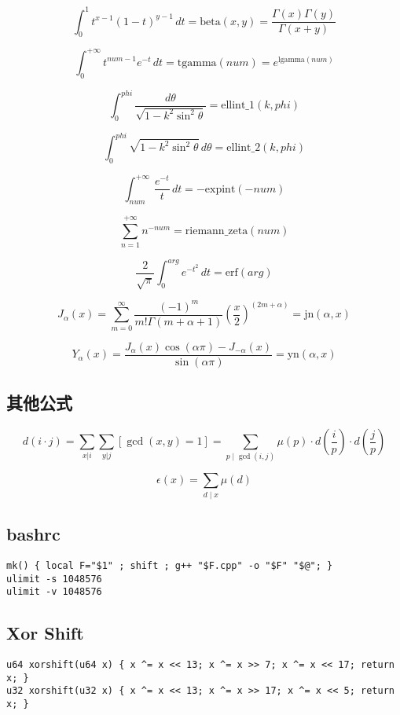 \documentclass[a4paper,landscape,twocolumn]{ctexart}
\begin{document}
{
\Large
$$ \int_0^1 t^{x-1}(1-t)^{y-1}\,dt = \mathrm{beta}(x,y) = \frac{\Gamma(x)\Gamma(y)}{\Gamma(x+y)} $$

$$ \int_0^{+\infty} t^{num-1}e^{-t}\,dt = \mathrm{tgamma}(num) = e^{\mathrm{lgamma}(num)}$$

$$ \int_0^{phi} \frac{d\theta}{\sqrt{1-k^2\sin^2\theta}} = \mathrm{ellint\_1}(k,phi) $$

$$ \int_0^{phi} \sqrt{1-k^2\sin^2\theta}\,d\theta = \mathrm{ellint\_2}(k,phi) $$

$$ \int_{num}^{+\infty} \frac{e^{-t}}{t}\,dt = -\mathrm{expint}(-num) $$

$$ \sum_{n=1}^{+\infty} n^{-num} = \mathrm{riemann\_zeta}(num) $$

$$ \frac{2}{\sqrt{\pi}}\int_0^{arg} e^{-t^2}\,dt = \mathrm{erf}(arg) $$

$$ J_{\alpha} (x) = \sum_{m = 0}^{\infty} \frac{(-1)^m}{m ! \Gamma (m + \alpha + 1)} \left(\frac{x}{2}\right) ^ {(2 m + \alpha)} = \mathrm{jn} (\alpha, x) $$

$$ Y_{\alpha} (x) = \frac{J_{\alpha} (x) \cos (\alpha \pi) - J_{ - \alpha} (x)}{\sin (\alpha \pi)} = \mathrm{yn} (\alpha, x) $$

}

\subsection{其他公式}

{
\Large
$$ d(i \cdot j) = \sum_{x | i} \sum_{y | j} [\gcd (x, y) = 1] = \sum_{p \mid \gcd (i, j)} \mu (p) \cdot d (\frac{i}{p}) \cdot d (\frac{j}{p}) $$

$$ \epsilon (x) = \sum \limits_{d \mid x} \mu (d) $$
}

\subsection{bashrc}

\begin{lstlisting}
mk() { local F="$1" ; shift ; g++ "$F.cpp" -o "$F" "$@"; }
ulimit -s 1048576
ulimit -v 1048576
\end{lstlisting}

\subsection{Xor \space Shift}

\begin{lstlisting}
u64 xorshift(u64 x) { x ^= x << 13; x ^= x >> 7; x ^= x << 17; return x; }
u32 xorshift(u32 x) { x ^= x << 13; x ^= x >> 17; x ^= x << 5; return x; }
\end{lstlisting}
\end{document}

